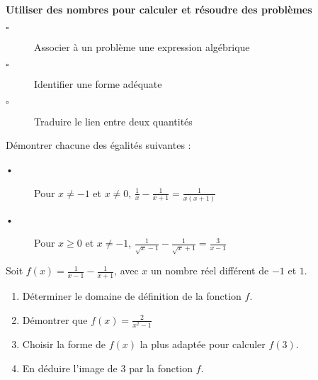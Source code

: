 \begin{titre}

\end{titre}


\begin{CpsCol}
\textbf{Utiliser des nombres pour calculer et résoudre des problèmes}
\begin{description}
\item[$\square$] Associer à un problème une expression algébrique
\item[$\square$] Identifier une forme adéquate
\item[$\square$] Traduire le lien entre deux quantités
\end{description}
\end{CpsCol}









Démontrer chacune des égalités suivantes :
\begin{description}
\item[•] Pour $x \neq -1$ et $x \neq 0$, $\frac{1}{x}-\frac{1}{x+1}=\frac{1}{x(x+1)}$
\item[•] Pour $x \geq 0$ et $x \neq -1$, $\frac{1}{\sqrt{x}-1}-\frac{1}{\sqrt{x}+1}=\frac{3}{x-1}$
\end{description}



Soit $f(x) =\frac{1}{x-1} -\frac{1}{x+1}$, avec $x$ un nombre réel différent de $-1$ et $1$.

\begin{enumerate}
\item Déterminer le domaine de définition de la fonction $f$.
\item Démontrer que $f(x)=\frac{2}{x^2-1}$
\item Choisir la forme de $f(x)$ la plus adaptée pour calculer $f(3)$.
\item En déduire l'image de 3 par la fonction $f$.
\end{enumerate}
